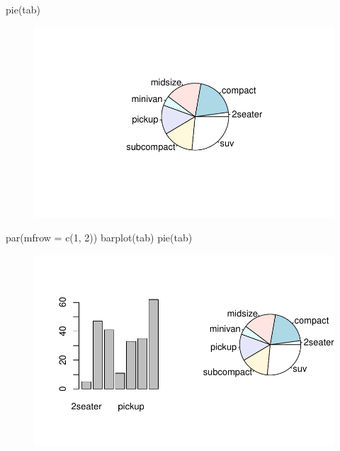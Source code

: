 \documentclass[
  letterpaper,
  DIV=11,
  numbers=noendperiod]{scrreprt}
\newenvironment{Shaded}{\begin{snugshade}}{\end{snugshade}}
\newcommand{\AttributeTok}[1]{\textcolor[rgb]{0.40,0.45,0.13}{#1}}
\newcommand{\DecValTok}[1]{\textcolor[rgb]{0.68,0.00,0.00}{#1}}
\newcommand{\FunctionTok}[1]{\textcolor[rgb]{0.28,0.35,0.67}{#1}}
\newcommand{\NormalTok}[1]{\textcolor[rgb]{0.00,0.23,0.31}{#1}}
\begin{document}
\begin{Shaded}
\begin{Highlighting}[]
\FunctionTok{pie}\NormalTok{(tab)}
\end{Highlighting}
\end{Shaded}

\begin{figure}[H]

{\centering \includegraphics{data_analysis_files/figure-pdf/unnamed-chunk-3-2.pdf}

}

\end{figure}

\begin{Shaded}
\begin{Highlighting}[]
\FunctionTok{par}\NormalTok{(}\AttributeTok{mfrow =} \FunctionTok{c}\NormalTok{(}\DecValTok{1}\NormalTok{, }\DecValTok{2}\NormalTok{))}
\FunctionTok{barplot}\NormalTok{(tab)}
\FunctionTok{pie}\NormalTok{(tab)}
\end{Highlighting}
\end{Shaded}

\begin{figure}[H]

{\centering \includegraphics{data_analysis_files/figure-pdf/unnamed-chunk-3-3.pdf}

}

\end{figure}
\end{document}
